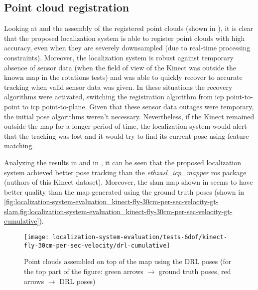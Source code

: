 \subsection{Point cloud registration}

Looking at  and the assembly of the registered point clouds (shown in ), it is clear that the proposed localization system is able to register point clouds with high accuracy, even when they are severely downsampled (due to real-time processing constraints). Moreover, the localization system is robust against temporary absence of sensor data (when the field of view of the Kinect was outside the known map in the rotations tests) and was able to quickly recover to accurate tracking when valid sensor data was given. In these situations the recovery algorithms were activated, switching the registration algorithm from \gls{icp} point-to-point to \gls{icp} point-to-plane. Given that these sensor data outages were temporary, the initial pose algorithms weren't necessary. Nevertheless, if the Kinect remained outside the map for a longer period of time, the localization system would alert that the tracking was lost and it would try to find its current pose using feature matching.

Analyzing the results in  and in , it can be seen that the proposed localization system achieved better pose tracking than the \emph{ethzasl\_icp\_mapper} \gls{ros} package \cite{Pomerleau2011} (authors of this Kinect dataset). Moreover, the \gls{slam} map shown in  seems to have better quality than the map generated using the ground truth poses (shown in \cref{fig:localization-system-evaluation_kinect-fly-30cm-per-sec-velocity-gt-slam,fig:localization-system-evaluation_kinect-fly-30cm-per-sec-velocity-gt-cumulative}).

\begin{figure}[H]
	\centering
	\texttt{[image: localization-system-evaluation/tests-6dof/kinect-fly-30cm-per-sec-velocity/drl-cumulative]}
	\caption{Point clouds assembled on top of the map using the DRL poses (for the top part of the figure: green arrows $\rightarrow$ ground truth poses, red arrows $\rightarrow$ DRL poses)}
	\label{fig:localization-system-evaluation_kinect-fly-30cm-per-sec-velocity-drl-cumulative}
\end{figure}

